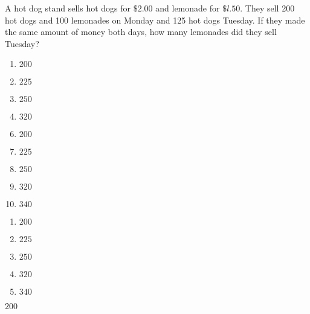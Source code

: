A hot dog stand sells hot dogs for $\$2.00$ and lemonade for $\$l.50$. They sell 200 hot dogs and 100 lemonades on Monday and 125 hot dogs Tuesday. If they made the same amount of money both days, how many lemonades did they sell Tuesday?

\ifsat
	\begin{enumerate}[label=\Alph*)]
		\item   $200$ %
		\item  $225$ 
		\item  $250$ 
		\item  $320$
	\end{enumerate}
\else
\fi

\ifacteven
	\begin{enumerate}[label=\textbf{\Alph*.},itemsep=\fill,align=left]
		\setcounter{enumii}{5}
		\item   $200$ %
		\item  $225$ 
		\item  $250$ 
		\addtocounter{enumii}{1}
		\item  $320$ 
		\item  $340$ 
	\end{enumerate}
\else
\fi

\ifactodd
	\begin{enumerate}[label=\textbf{\Alph*.},itemsep=\fill,align=left]
		\item   $200$ %
		\item  $225$ 
		\item  $250$ 
		\item  $320$ 
		\item  $340$ 
	\end{enumerate}
\else
\fi

\ifgridin
   $200$ %
		
\else
\fi

